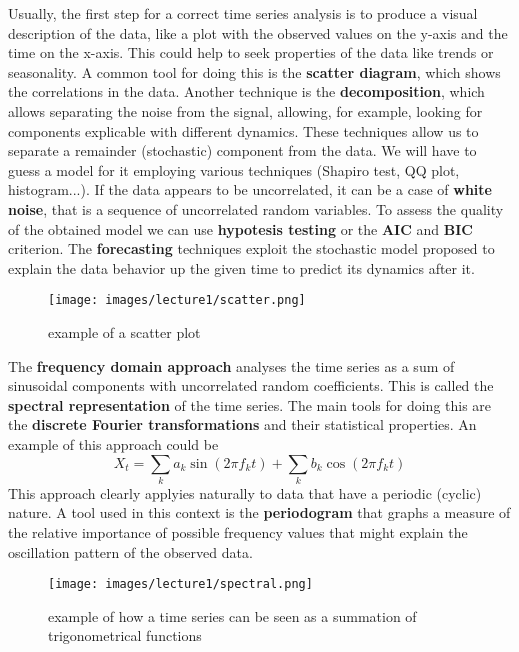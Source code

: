 Usually, the first step for a correct time series analysis is to produce a visual description of the data, like a plot with the observed values on the y-axis and the time on the x-axis. This could help to seek properties of the data like trends or seasonality. A common tool for doing this is the \textbf{scatter diagram}, which shows the correlations in the data. Another technique is the \textbf{decomposition}, which allows separating the noise from the signal, allowing, for example, looking for components explicable with different dynamics. These techniques allow us to separate a remainder (stochastic) component from the data. We will have to guess a model for it employing various techniques (Shapiro test, QQ plot, histogram...). If the data appears to be uncorrelated, it can be a case of \textbf{white noise}, that is a sequence of uncorrelated random variables. To assess the quality of the obtained model we can use \textbf{hypotesis testing} or the \textbf{AIC} and \textbf{BIC} criterion. The \textbf{forecasting} techniques exploit the stochastic model proposed to explain the data behavior up the given time to predict its dynamics after it. 
\begin{figure}[htbp]
    \centering
    \texttt{[image: images/lecture1/scatter.png]}
    \caption{example of a scatter plot}
\end{figure}

The \textbf{frequency domain approach} analyses the time series as a sum of sinusoidal components with uncorrelated random coefficients. This is called the \textbf{spectral representation} of the time series. The main tools for doing this are the \textbf{discrete Fourier transformations} and their statistical properties. An example of this approach could be
\[
    X_t=\sum_{k}a_k\sin(2\pi f_kt)+\sum_{k}b_k\cos(2\pi f_kt)    
\]
This approach clearly applyies naturally to data that have a periodic (cyclic) nature. A tool used in this context is the \textbf{periodogram} that graphs a measure of the relative importance of possible frequency values that might explain the oscillation pattern of the observed data.
\begin{figure}[htbp]
    \centering
    \texttt{[image: images/lecture1/spectral.png]}
    \caption{example of how a time series can be seen as a summation of trigonometrical functions}
\end{figure}
